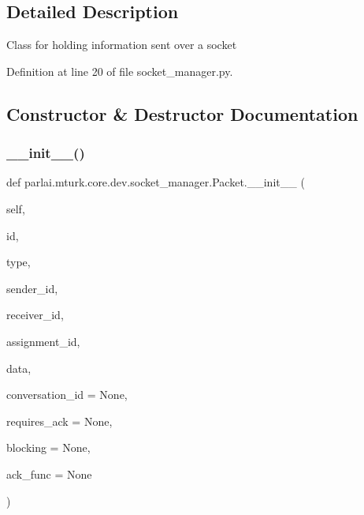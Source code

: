 \subsection{Detailed Description}
\begin{DoxyVerb}Class for holding information sent over a socket\end{DoxyVerb}
 

Definition at line 20 of file socket\+\_\+manager.\+py.



\subsection{Constructor \& Destructor Documentation}
\mbox{\label{classparlai_1_1mturk_1_1core_1_1dev_1_1socket__manager_1_1Packet_a7e36ad36f81a8e412efa30404b7dd07d}} 
\subsubsection{\texorpdfstring{\+\_\+\+\_\+init\+\_\+\+\_\+()}{\_\_init\_\_()}}
{\footnotesize\ttfamily def parlai.\+mturk.\+core.\+dev.\+socket\+\_\+manager.\+Packet.\+\_\+\+\_\+init\+\_\+\+\_\+ (\begin{DoxyParamCaption}\item[{}]{self,  }\item[{}]{id,  }\item[{}]{type,  }\item[{}]{sender\+\_\+id,  }\item[{}]{receiver\+\_\+id,  }\item[{}]{assignment\+\_\+id,  }\item[{}]{data,  }\item[{}]{conversation\+\_\+id = {\ttfamily None},  }\item[{}]{requires\+\_\+ack = {\ttfamily None},  }\item[{}]{blocking = {\ttfamily None},  }\item[{}]{ack\+\_\+func = {\ttfamily None} }\end{DoxyParamCaption})}

